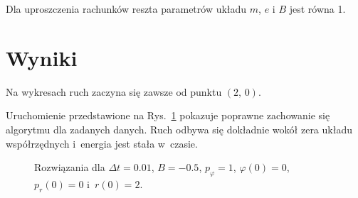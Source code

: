 \documentclass[a4paper; 12pt]{article}
\begin{document}
Dla uproszczenia rachunków reszta parametrów układu $m$, $e$ i $B$ jest równa \num{1}.

\section{Wyniki}

Na wykresach ruch zaczyna się zawsze od punktu $(2,\,0)$.

Uruchomienie przedstawione na Rys.~\ref{fig:data1} pokazuje poprawne zachowanie
się algorytmu dla zadanych danych.
Ruch odbywa się dokładnie wokół zera układu współrzędnych i~energia jest stała
w~czasie.
\begin{figure}
    \centering
    \caption{Rozwiązania dla $\Delta t=\num{0.01}$, $B=\num{-0.5}$,
        $p_\varphi=\num{1}$, $\varphi(0)=\num{0}$, $p_r(0)=\num{0}$
        i~$r(0)=\num{2}$.}
    \label{fig:data1}
\end{figure}
\end{document}

